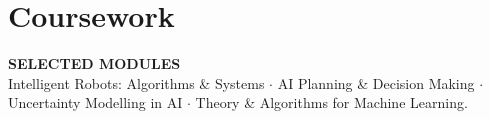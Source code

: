 \section{Coursework}

\vspace{2pt}
{\rmfamily\bfseries\color{accent}\footnotesize\MakeUppercase{Selected Modules}}\\[3pt]
Intelligent Robots: Algorithms \& Systems\,\,$\cdot$\,\,AI Planning \& Decision Making\,\,$\cdot$\,\,Uncertainty Modelling in AI\,\,$\cdot$\,\,Theory \& Algorithms for Machine Learning.
